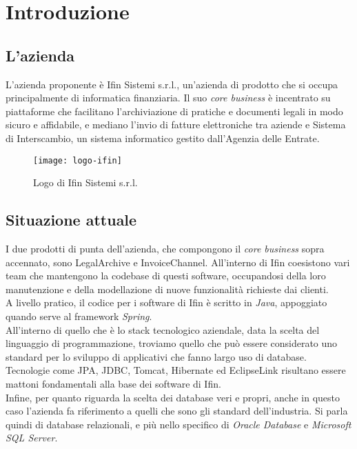 
\chapter{Introduzione}
\label{cap:introduzione}

\section{L'azienda}

L'azienda proponente è Ifin Sistemi s.r.l., un'azienda di prodotto che si occupa principalmente di informatica finanziaria.
Il suo \textit{core business} è incentrato su piattaforme che facilitano l'archiviazione di pratiche e documenti legali in modo sicuro e affidabile, e mediano l'invio di fatture elettroniche tra aziende e Sistema di Interscambio, un sistema informatico gestito dall'Agenzia delle Entrate.

\vspace{15pt}
\begin{figure}[htbp]
\begin{center}
\texttt{[image: logo-ifin]}
\caption{Logo di Ifin Sistemi s.r.l.}
\end{center}
\end{figure}
\vspace{15pt}

\section{Situazione attuale}

I due prodotti di punta dell'azienda, che compongono il \textit{core business} sopra accennato, sono LegalArchive e InvoiceChannel. All'interno di Ifin coesistono vari team che mantengono la codebase di questi software, occupandosi della loro manutenzione e della modellazione di nuove funzionalità richieste dai clienti.\\
A livello pratico, il codice per i software di Ifin è scritto in \textit{Java}, appoggiato quando serve al framework \textit{Spring}.\\
All'interno di quello che è lo stack tecnologico aziendale, data la scelta del linguaggio di programmazione, troviamo quello che può essere considerato uno standard per lo sviluppo di applicativi che fanno largo uso di database. Tecnologie come \gls{JPA}, \gls{JDBC}, \gls{Tomcat}, \gls{Hibernate} ed \gls{EclipseLink} risultano essere mattoni fondamentali alla base dei software di Ifin.\\
Infine, per quanto riguarda la scelta dei database veri e propri, anche in questo caso l'azienda fa riferimento a quelli che sono gli standard dell'industria. Si parla quindi di database relazionali, e più nello specifico di \textit{Oracle Database} e \textit{Microsoft SQL Server}.\\

